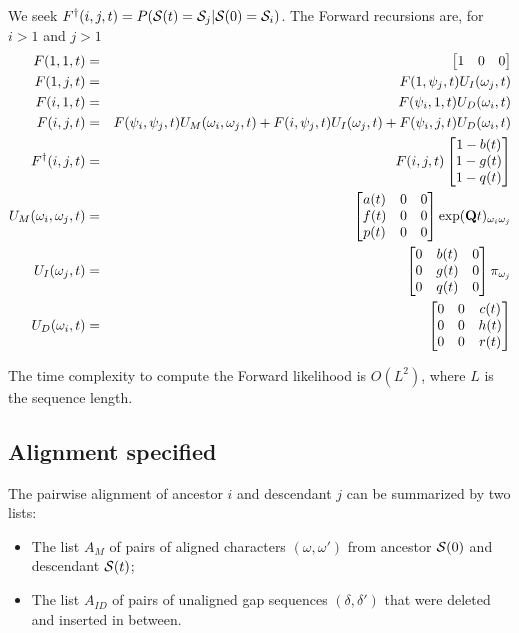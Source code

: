 \documentclass{article}
\begin{document}
We seek $F^\dagger(i,j,t) = P({\cal S}(t)={\cal S}_j|{\cal S}(0)={\cal S}_i)$.
The Forward recursions are, for $i>1$ and $j>1$
\begin{eqnarray*}
F(1,1,t) & = & \begin{bmatrix} 1 & 0 & 0 \end{bmatrix}
\\
F(1,j,t) & = &
F(1,\psi_j,t) U_I(\omega_j,t)
\\
F(i,1,t) & = &
F(\psi_i,1,t) U_D(\omega_i,t)
\\
F(i,j,t) & = &
F(\psi_i,\psi_j,t) U_M(\omega_i,\omega_j,t)
+ F(i,\psi_j,t) U_I(\omega_j,t)
+ F(\psi_i,j,t) U_D(\omega_i,t)
\\
F^\dagger(i,j,t) & = & F(i,j,t) \begin{bmatrix}
1-b(t) \\
1-g(t) \\
1-q(t) \end{bmatrix}
\\
U_M(\omega_i,\omega_j,t) & = &
\begin{bmatrix}
a(t) & 0 & 0 \\
f(t) & 0 & 0 \\
p(t) & 0 & 0 
\end{bmatrix}
\exp({\bf Q}t)_{\omega_i \omega_j}
\\
U_I(\omega_j,t) & = &
\begin{bmatrix}
0 & b(t) & 0 \\
0 & g(t) & 0 \\
0 & q(t) & 0 
\end{bmatrix}
\pi_{\omega_j}
\\
U_D(\omega_i,t) & = &
\begin{bmatrix}
0 & 0 & c(t) \\
0 & 0 & h(t) \\
0 & 0 & r(t) 
\end{bmatrix}
\end{eqnarray*}

The time complexity to compute the Forward likelihood is $O(L^2)$,
where $L$ is the sequence length.

\subsection{Alignment specified}

The pairwise alignment of ancestor $i$ and descendant $j$ can be summarized by two lists:
\begin{itemize}
    \item The list $A_M$ of pairs of aligned characters $(\omega,\omega')$ from ancestor ${\cal S}(0)$ and descendant ${\cal S}(t)$;
    \item The list $A_{ID}$ of pairs of unaligned gap sequences $(\delta,\delta')$ that were deleted and inserted in between.
\end{itemize}
\end{document}
